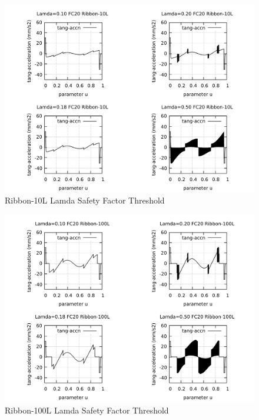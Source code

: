 \clearpage
\pagebreak
\begin{landscape}
	\begin{figure}
		\centering
		\caption  {Ribbon-10L Lamda Safety Factor Threshold}
		\label{img-Ribbon-10L Lamda Safety Factor Threshold}
		\includegraphics[width=1.30\textwidth]{Chap4/Lamda/img-4plots-RIBBON-10L-Lamda-010-018-020-050-FC20-Tang-Accn.pdf} 
	\end{figure}
\end{landscape}

\clearpage
\pagebreak
\begin{landscape}
	\begin{figure}
		\centering
		\caption  {Ribbon-100L Lamda Safety Factor Threshold}
		\label{img-Ribbon-100L Lamda Safety Factor Threshold}
		\includegraphics[width=1.30\textwidth]{Chap4/Lamda/img-4plots-RIBBON-100L-Lamda-010-018-020-050-FC20-Tang-Accn.pdf} 
	\end{figure}
\end{landscape}

